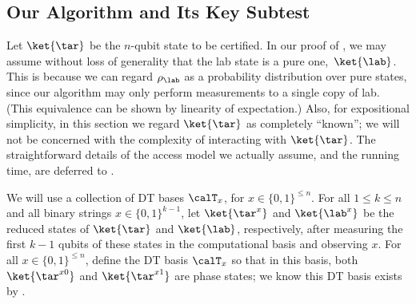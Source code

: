 
\subsection{Our Algorithm and Its Key Subtest}
\newcommand{\tarline}{\ket{\tar'}}
\newcommand{\labline}{\ket{\lab'}}
Let $\ket{\tar}$ be the $n$-qubit state to be certified. In our proof of , we may assume without loss of generality that the lab state is a pure one,~$\ket{\lab}$. This is because we can regard $\rho_{\lab}$ as a probability distribution over pure states, since our algorithm may only perform measurements to a single copy of lab. (This equivalence can be shown by linearity of expectation.)
Also, for expositional simplicity, in this section we regard $\ket{\tar}$ as completely ``known''; we will not be concerned with the complexity of interacting with $\ket{\tar}$.  The straightforward details of the access model we actually assume, and the running time, are deferred to .

We will use a collection of DT bases $\calT_x$, for $x\in \{0,1\}^{\leq n}$.
For all $1\leq k\leq n$ and all binary strings $x\in\{0,1\}^{k-1}$, let $\ket{\tar^x}$ and $\ket{\lab^x}$ be the reduced states of $\ket{\tar}$ and $\ket{\lab}$, respectively, after measuring the first $k-1$ qubits of these states in the computational basis and observing $x$. For all $x\in\{0,1\}^{\leq n}$, define the DT basis $\calT_x$ so that in this basis, both $\ket{\tar^{x0}}$ and $\ket{\tar^{x1}}$ are phase states; we know this DT basis exists by .

